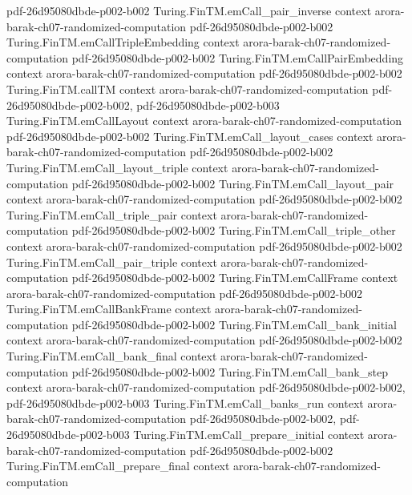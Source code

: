 \begin{theorem}
  {pdf-26d95080dbde-p002-b002}
\proofstep
  {Turing.FinTM.emCall_pair_inverse}
  {context}
  {arora-barak-ch07-randomized-computation}
  {pdf-26d95080dbde-p002-b002}
\proofstep
  {Turing.FinTM.emCallTripleEmbedding}
  {context}
  {arora-barak-ch07-randomized-computation}
  {pdf-26d95080dbde-p002-b002}
\proofstep
  {Turing.FinTM.emCallPairEmbedding}
  {context}
  {arora-barak-ch07-randomized-computation}
  {pdf-26d95080dbde-p002-b002}
\proofstep
  {Turing.FinTM.callTM}
  {context}
  {arora-barak-ch07-randomized-computation}
  {pdf-26d95080dbde-p002-b002,
    pdf-26d95080dbde-p002-b003}
\proofstep
  {Turing.FinTM.emCallLayout}
  {context}
  {arora-barak-ch07-randomized-computation}
  {pdf-26d95080dbde-p002-b002}
\proofstep
  {Turing.FinTM.emCall_layout_cases}
  {context}
  {arora-barak-ch07-randomized-computation}
  {pdf-26d95080dbde-p002-b002}
\proofstep
  {Turing.FinTM.emCall_layout_triple}
  {context}
  {arora-barak-ch07-randomized-computation}
  {pdf-26d95080dbde-p002-b002}
\proofstep
  {Turing.FinTM.emCall_layout_pair}
  {context}
  {arora-barak-ch07-randomized-computation}
  {pdf-26d95080dbde-p002-b002}
\proofstep
  {Turing.FinTM.emCall_triple_pair}
  {context}
  {arora-barak-ch07-randomized-computation}
  {pdf-26d95080dbde-p002-b002}
\proofstep
  {Turing.FinTM.emCall_triple_other}
  {context}
  {arora-barak-ch07-randomized-computation}
  {pdf-26d95080dbde-p002-b002}
\proofstep
  {Turing.FinTM.emCall_pair_triple}
  {context}
  {arora-barak-ch07-randomized-computation}
  {pdf-26d95080dbde-p002-b002}
\proofstep
  {Turing.FinTM.emCallFrame}
  {context}
  {arora-barak-ch07-randomized-computation}
  {pdf-26d95080dbde-p002-b002}
\proofstep
  {Turing.FinTM.emCallBankFrame}
  {context}
  {arora-barak-ch07-randomized-computation}
  {pdf-26d95080dbde-p002-b002}
\proofstep
  {Turing.FinTM.emCall_bank_initial}
  {context}
  {arora-barak-ch07-randomized-computation}
  {pdf-26d95080dbde-p002-b002}
\proofstep
  {Turing.FinTM.emCall_bank_final}
  {context}
  {arora-barak-ch07-randomized-computation}
  {pdf-26d95080dbde-p002-b002}
\proofstep
  {Turing.FinTM.emCall_bank_step}
  {context}
  {arora-barak-ch07-randomized-computation}
  {pdf-26d95080dbde-p002-b002,
    pdf-26d95080dbde-p002-b003}
\proofstep
  {Turing.FinTM.emCall_banks_run}
  {context}
  {arora-barak-ch07-randomized-computation}
  {pdf-26d95080dbde-p002-b002,
    pdf-26d95080dbde-p002-b003}
\proofstep
  {Turing.FinTM.emCall_prepare_initial}
  {context}
  {arora-barak-ch07-randomized-computation}
  {pdf-26d95080dbde-p002-b002}
\proofstep
  {Turing.FinTM.emCall_prepare_final}
  {context}
  {arora-barak-ch07-randomized-computation}

\end{theorem}
